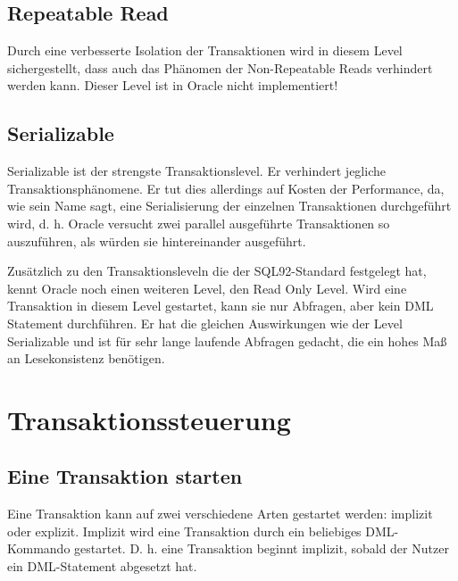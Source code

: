       \subsection{Repeatable Read}
        Durch eine verbesserte Isolation der Transaktionen wird in diesem Level sichergestellt, dass auch das Phänomen der Non-Repeatable Reads verhindert werden kann. Dieser Level ist in Oracle nicht implementiert!
      \subsection{Serializable}
        Serializable ist der strengste Transaktionslevel. Er verhindert jegliche Trans\-akt\-ions\-phä\-no\-me\-ne. Er tut dies allerdings auf Kosten der Performance, da, wie sein Name sagt, eine Serialisierung der einzelnen Transaktionen durchgeführt wird, d. h. Oracle versucht zwei parallel ausgeführte Transaktionen so auszuführen, als würden sie hintereinander ausgeführt.

        Zusätzlich zu den Transaktionsleveln die der SQL92-Standard festgelegt hat, kennt Oracle noch einen weiteren Level, den Read Only Level. Wird eine Transaktion in diesem Level gestartet, kann sie nur Abfragen, aber kein DML Statement durchführen. Er hat die gleichen Auswirkungen wie der Level Serializable und ist für sehr lange laufende Abfragen gedacht, die ein hohes Maß an Lesekonsistenz benötigen.


    \section{Transaktionssteuerung}
      \subsection{Eine Transaktion starten}
        Eine Transaktion kann auf zwei verschiedene Arten gestartet werden: implizit oder explizit. Implizit wird eine Transaktion durch ein beliebiges DML-Kommando gestartet. D. h. eine Transaktion beginnt implizit, sobald der Nutzer ein DML-Statement abgesetzt hat.

